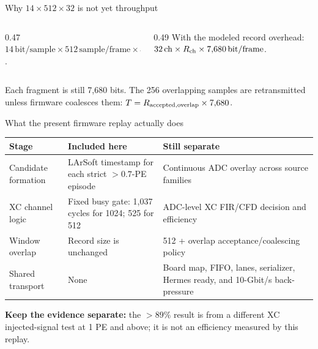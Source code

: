 \documentclass[aspectratio=169,11pt]{beamer}
\begin{document}
\begin{frame}{Why \(14\times512\times32\) is not yet throughput}
  \begin{columns}[T,onlytextwidth]
    \begin{column}{0.47\textwidth}
        {\(14\,\mathrm{bit/sample}\times512\,\mathrm{sample/frame}\times32\,\mathrm{ch}=229{,}376\,\mathrm{bit}\).}
    \end{column}
    \begin{column}{0.49\textwidth}
        {With the modeled record overhead: \(32\,\mathrm{ch}\times R_{\rm ch}\times7{,}680\,\mathrm{bit/frame}\).}
    \end{column}
  \end{columns}

  \medskip
    {Each fragment is still 7,680 bits. The 256 overlapping samples are retransmitted unless firmware coalesces them: \(T=R_{\rm accepted,overlap}\times7{,}680\).}

\end{frame}

\begin{frame}{What the present firmware replay actually does}
  \footnotesize
  \setlength{\tabcolsep}{4pt}
  \renewcommand{\arraystretch}{1.06}
  \begin{tabular}{@{}p{}p{}p{}@{}}
    \toprule
    Stage & Included here & Still separate \\
    \midrule
    Candidate formation & LArSoft timestamp for each strict $>0.7$-PE episode & Continuous ADC overlay across source families \\
    XC channel logic & Fixed busy gate: 1,037 cycles for 1024; 525 for 512 & ADC-level XC FIR/CFD decision and efficiency \\
    Window overlap & Record size is unchanged & 512 + overlap acceptance/coalescing policy \\
    Shared transport & None & Board map, FIFO, lanes, serializer, Hermes ready, and 10-Gbit/s back-pressure \\
    \bottomrule
  \end{tabular}

  \medskip
  \centering
  \textbf{Keep the evidence separate:} the $>89\%$ result is from a different XC injected-signal test at 1 PE and above; it is not an efficiency measured by this replay.
\end{frame}
\end{document}
